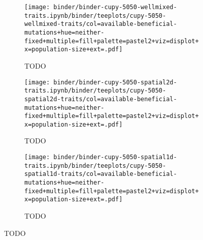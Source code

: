 \begin{figure}[h]

\begin{subfigure}[b]{\linewidth}
    \begin{minipage}{\textwidth}
      \centering
      \texttt{[image: binder/binder-cupy-5050-wellmixed-traits.ipynb/binder/teeplots/cupy-5050-wellmixed-traits/col=available-beneficial-mutations+hue=neither-fixed+multiple=fill+palette=pastel2+viz=displot+x=population-size+ext=.pdf]}%
    \end{minipage}
    \begin{minipage}{\textwidth}
    \caption{TODO}
    \label{fig:neither-fixed-5050-cupy:wellmixed}
    \end{minipage}%
\end{subfigure}%

    \begin{subfigure}[b]{\linewidth}
        \begin{minipage}{\textwidth}
          \centering
          \texttt{[image: binder/binder-cupy-5050-spatial2d-traits.ipynb/binder/teeplots/cupy-5050-spatial2d-traits/col=available-beneficial-mutations+hue=neither-fixed+multiple=fill+palette=pastel2+viz=displot+x=population-size+ext=.pdf]}%
        \end{minipage}
        \begin{minipage}{\textwidth}
        \caption{TODO}
        \label{fig:neither-fixed-5050-cupy:spatial2d}
        \end{minipage}%
    \end{subfigure}%

    \begin{subfigure}[b]{\linewidth}
        \begin{minipage}{\textwidth}
        \centering
        \texttt{[image: binder/binder-cupy-5050-spatial1d-traits.ipynb/binder/teeplots/cupy-5050-spatial1d-traits/col=available-beneficial-mutations+hue=neither-fixed+multiple=fill+palette=pastel2+viz=displot+x=population-size+ext=.pdf]}%
        \end{minipage}
        \begin{minipage}{\textwidth}
        \caption{TODO}
        \label{fig:neither-fixed-5050-cupy:spatial1d}
        \end{minipage}%
    \end{subfigure}


\end{figure}
